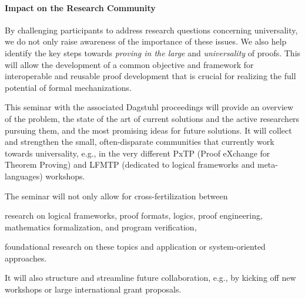 \paragraph{Impact on the Research Community}
By challenging participants to address research questions concerning
universality, we do not only raise awareness of the importance of these issues.
We also help identify the key steps towards \emph{proving in the large} and
\emph{universality} of proofs. This will allow the development of a common
objective and framework for interoperable and reusable proof development that is
crucial for realizing the full potential of formal mechanizations.

This seminar with the associated Dagstuhl proceedings will provide an overview
of the problem, the state of the art of current solutions and the active
researchers pursuing them, and the most promising ideas for future solutions. It
will collect and strengthen the small, often-disparate communities that
currently work towards universality, e.g., in the very different PxTP (Proof
eXchange for Theorem Proving) and LFMTP (dedicated to logical frameworks and
meta-languages) workshops.

The seminar will not only allow for cross-fertilization between
 \begin{compactitem}
  \item research on logical frameworks, proof formats, logics, proof
engineering, mathematics formalization, and program verification,
  \item foundational research on these topics and application or system-oriented
approaches.
 \end{compactitem} It will also structure and streamline future collaboration,
e.g., by kicking off new workshops or large international grant proposals.

